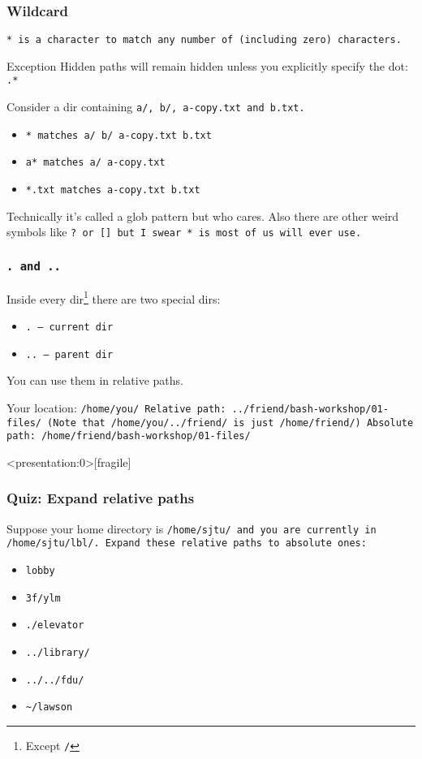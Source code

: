 \begin{frame}
\frametitle{Wildcard}
\tt{*} is a character to match any number of (including zero) characters.

\begin{block}{Exception}
    Hidden paths will remain hidden unless you explicitly specify the dot:
    \tt{.*}
\end{block}

\begin{example}
    Consider a dir containing \tt{a/}, \tt{b/}, \tt{a-copy.txt} and
    \tt{b.txt}.
    \begin{itemize}
        \item \tt{*} matches \tt{a/ b/ a-copy.txt b.txt}
        \item \tt{a*} matches \tt{a/ a-copy.txt}
        \item \tt{*.txt} matches \tt{a-copy.txt b.txt}
    \end{itemize}
\end{example}

\scriptsize{Technically it's called a glob pattern but who cares. Also there are other
weird symbols like \tt{?} or \tt{[]} but I swear \tt{*} is most of
us will ever use.}
\end{frame}

\begin{frame}
\frametitle{\tt{.} and \tt{..}}
Inside every dir\footnote{Except \tt{/}} there are two special dirs:
\begin{itemize}
    \item \tt{.} — current dir
    \item \tt{..} — parent dir
\end{itemize}

You can use them in relative paths.
\begin{example}
    Your location: \tt{/home/you/} \newline
    Relative path: \tt{../friend/bash-workshop/01-files/} \newline
    (Note that \tt{/home/you/../friend/} is just \tt{/home/friend/}) \newline
    Absolute path: \tt{/home/friend/bash-workshop/01-files/}
\end{example}
\end{frame}

\begin{frame}<presentation:0>[fragile]
\frametitle{Quiz: Expand relative paths}
Suppose your home directory is \tt{/home/sjtu/} and you are currently in
\tt{/home/sjtu/lbl/}. Expand these relative paths to absolute ones:
\begin{itemize}
    \item \tt{lobby}
    \item \tt{3f/ylm}
    \item \tt{./elevator}
    \item \tt{../library/}
    \item \tt{../../fdu/}
    \item \verb|~/lawson| %
\end{itemize}
\end{frame}

